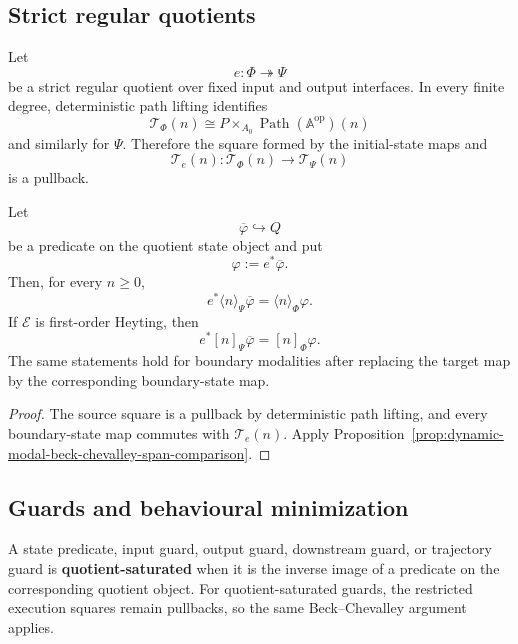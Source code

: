 \subsection{Strict regular quotients}
\label{subsec:dynamic-modal-strict-regular-quotients}

Let
\[
    e:\Phi\twoheadrightarrow\Psi
\]
be a strict regular quotient over fixed input and output interfaces.  In every
finite degree, deterministic path lifting identifies
\[
    \mathscr T_\Phi(n)
    \cong
    P\times_{A_0}\operatorname{Path}(\mathbb A^{\mathrm{op}})(n)
\]
and similarly for \(\Psi\).  Therefore the square formed by the initial-state
maps and
\[
    \mathscr T_e(n):
    \mathscr T_\Phi(n)\to\mathscr T_\Psi(n)
\]
is a pullback.

\begin{theorem}
\label{thm:dynamic-modal-invariance-trajectory-quotients}
Let
\[
    \overline\varphi\hookrightarrow Q
\]
be a predicate on the quotient state object and put
\[
    \varphi:=e^\ast\overline\varphi.
\]
Then, for every \(n\geq0\),
\[
    e^\ast
    \langle n\rangle_{\Psi}\overline\varphi
    =
    \langle n\rangle_{\Phi}\varphi.
\]
If \(\mathcal E\) is first-order Heyting, then
\[
    e^\ast
    [n]_{\Psi}\overline\varphi
    =
    [n]_{\Phi}\varphi.
\]
The same statements hold for boundary modalities after replacing the target
map by the corresponding boundary-state map.
\end{theorem}

\begin{proof}
The source square is a pullback by deterministic path lifting, and every
boundary-state map commutes with \(\mathscr T_e(n)\).  Apply
Proposition~\ref{prop:dynamic-modal-beck-chevalley-span-comparison}.
\end{proof}

\subsection{Guards and behavioural minimization}
\label{subsec:dynamic-guards-behavioural-minimization}

A state predicate, input guard, output guard, downstream guard, or trajectory
guard is \textbf{quotient-saturated} when it is the inverse image of a
predicate on the corresponding quotient object.  For quotient-saturated
guards, the restricted execution squares remain pullbacks, so the same
Beck--Chevalley argument applies.

